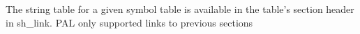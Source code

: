 \clearpage
{}
The string table for a given symbol table is available in the table's section header in sh\_link.
PAL only supported links to previous sections